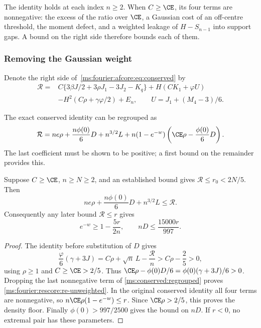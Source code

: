 The identity holds at each index $n\ge2$. When $C\ge\CE$,
its four terms are nonnegative: the excess of the ratio over $\CE$, a
Gaussian cost of an off-centre threshold, the moment defect, and a weighted leakage
of $H-S_{n-1}$ into support gaps. A bound on the right side therefore
bounds each of them.

\subsubsection{Removing the Gaussian weight}

Denote the right side of~\eqref{ms:fourier:afcore:eq:conserved} by
\begin{equation}\label{ms:fourier:rescore:re-raw}
\begin{aligned}
 \mathcal R={}&C\{3\beta J/2+3\rho J_1-3J_2-K_q\}
 +H(CK_1+\varphi U)\\
 &-H^2(C\rho+\gamma\varphi/2)+E_n,\qquad
 U=J_1+(M_4-3)/6.
\end{aligned}
\end{equation}

The exact conserved identity can be regrouped as
\begin{equation}\label{ms:conserved:regrouped}
 \mathcal R=ne\rho+\frac{n\phi(0)}6D+n^{3/2}L
 +n(1-e^{-w})\left(\CE\rho-\frac{\phi(0)}6D\right).
\end{equation}
The last coefficient must be shown to be positive; a first bound on the
remainder provides this.

\begin{lemma}\label{ms:fourier:rescore:re-weight}
Suppose $C\ge\CE$, $n\ge N\ge2$, and an established bound gives
$\mathcal R\le r_0<2N/5$. Then
\begin{equation}\label{ms:fourier:rescore:re-unweighted}
 ne\rho+\frac{n\phi(0)}6D+n^{3/2}L\le\mathcal R.
\end{equation}
Consequently any later bound $\mathcal R\le r$ gives
\[
 e^{-w}\ge1-\frac{5r}{2n},\qquad
 nD\le\frac{15000r}{997}.
\]
\end{lemma}
\begin{proof}
The identity before substitution of $D$ gives
\[
 \frac{\varphi}{6}(\gamma+3J)
 =C\rho+\sqrt n\,L-\frac{\mathcal R}{n}
 >C\rho-\frac25>0,
\]
using $\rho\ge1$ and $C\ge\CE>2/5$. Thus
$\CE\rho-\phi(0)D/6=\phi(0)(\gamma+3J)/6>0$.
Dropping the last nonnegative term of
\eqref{ms:conserved:regrouped} proves
\eqref{ms:fourier:rescore:re-unweighted}.
In the original conserved identity all four terms are nonnegative,
so $n\CE\rho(1-e^{-w})\le r$. Since $\CE\rho>2/5$, this proves
the density floor. Finally $\phi(0)>997/2500$ gives the bound on $nD$.
If $r<0$, no extremal pair has these parameters.
\end{proof}

